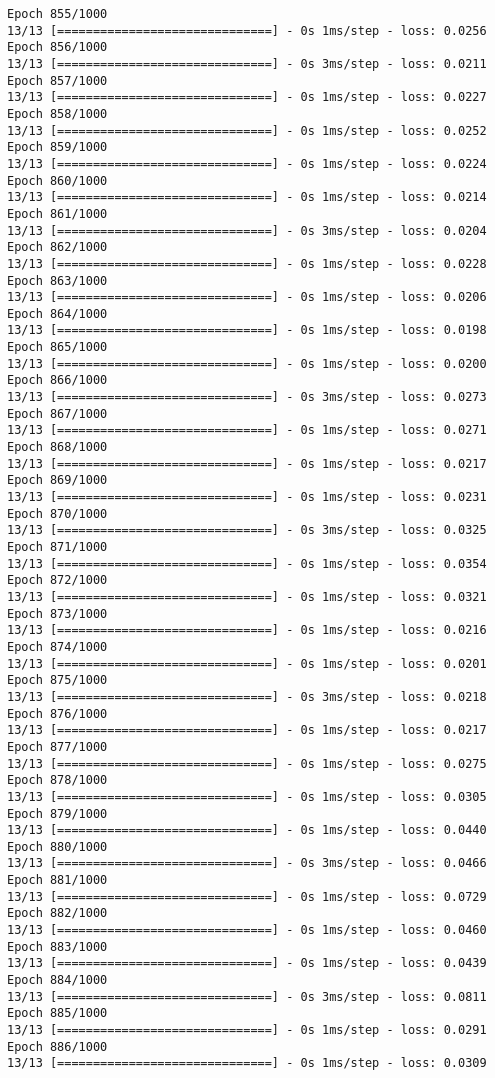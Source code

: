 \documentclass[11pt]{article}
\begin{document}
\begin{Verbatim}[commandchars=\\\{\}]
Epoch 855/1000
13/13 [==============================] - 0s 1ms/step - loss: 0.0256
Epoch 856/1000
13/13 [==============================] - 0s 3ms/step - loss: 0.0211
Epoch 857/1000
13/13 [==============================] - 0s 1ms/step - loss: 0.0227
Epoch 858/1000
13/13 [==============================] - 0s 1ms/step - loss: 0.0252
Epoch 859/1000
13/13 [==============================] - 0s 1ms/step - loss: 0.0224
Epoch 860/1000
13/13 [==============================] - 0s 1ms/step - loss: 0.0214
Epoch 861/1000
13/13 [==============================] - 0s 3ms/step - loss: 0.0204
Epoch 862/1000
13/13 [==============================] - 0s 1ms/step - loss: 0.0228
Epoch 863/1000
13/13 [==============================] - 0s 1ms/step - loss: 0.0206
Epoch 864/1000
13/13 [==============================] - 0s 1ms/step - loss: 0.0198
Epoch 865/1000
13/13 [==============================] - 0s 1ms/step - loss: 0.0200
Epoch 866/1000
13/13 [==============================] - 0s 3ms/step - loss: 0.0273
Epoch 867/1000
13/13 [==============================] - 0s 1ms/step - loss: 0.0271
Epoch 868/1000
13/13 [==============================] - 0s 1ms/step - loss: 0.0217
Epoch 869/1000
13/13 [==============================] - 0s 1ms/step - loss: 0.0231
Epoch 870/1000
13/13 [==============================] - 0s 3ms/step - loss: 0.0325
Epoch 871/1000
13/13 [==============================] - 0s 1ms/step - loss: 0.0354
Epoch 872/1000
13/13 [==============================] - 0s 1ms/step - loss: 0.0321
Epoch 873/1000
13/13 [==============================] - 0s 1ms/step - loss: 0.0216
Epoch 874/1000
13/13 [==============================] - 0s 1ms/step - loss: 0.0201
Epoch 875/1000
13/13 [==============================] - 0s 3ms/step - loss: 0.0218
Epoch 876/1000
13/13 [==============================] - 0s 1ms/step - loss: 0.0217
Epoch 877/1000
13/13 [==============================] - 0s 1ms/step - loss: 0.0275
Epoch 878/1000
13/13 [==============================] - 0s 1ms/step - loss: 0.0305
Epoch 879/1000
13/13 [==============================] - 0s 1ms/step - loss: 0.0440
Epoch 880/1000
13/13 [==============================] - 0s 3ms/step - loss: 0.0466
Epoch 881/1000
13/13 [==============================] - 0s 1ms/step - loss: 0.0729
Epoch 882/1000
13/13 [==============================] - 0s 1ms/step - loss: 0.0460
Epoch 883/1000
13/13 [==============================] - 0s 1ms/step - loss: 0.0439
Epoch 884/1000
13/13 [==============================] - 0s 3ms/step - loss: 0.0811
Epoch 885/1000
13/13 [==============================] - 0s 1ms/step - loss: 0.0291
Epoch 886/1000
13/13 [==============================] - 0s 1ms/step - loss: 0.0309

\end{Verbatim}
\end{document}
